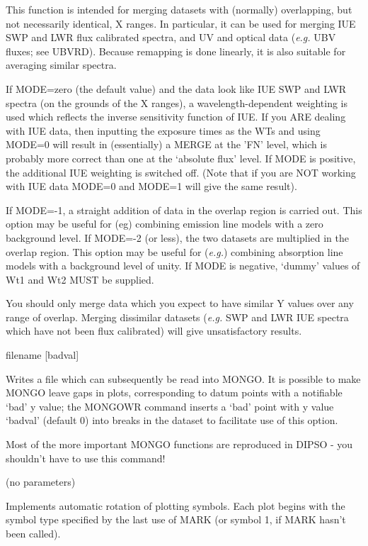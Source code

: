 \begin {description}
This function is intended for merging datasets with (normally)
overlapping, but not necessarily identical, X ranges. In particular,
it can be used for merging IUE SWP and LWR flux calibrated spectra,
and UV and optical data ({\em e.g.} UBV fluxes; see UBVRD). Because
remapping is done linearly, it is also suitable for averaging similar
spectra.

If MODE=zero (the default value) and the data look like IUE SWP and
LWR spectra (on the grounds of the X ranges), a wavelength-dependent
weighting is used which reflects the inverse sensitivity function of
IUE. If you ARE dealing with IUE data, then inputting the exposure
times as the WTs and using MODE=0 will result in (essentially) a MERGE
at the 'FN' level, which is probably more correct than one at the
`absolute flux' level. If MODE is positive, the additional IUE
weighting is switched off. (Note that if you are NOT working with IUE
data MODE=0 and MODE=1 will give the same result).

If MODE=-1, a straight addition of data in the overlap region is
carried out. This option may be useful for (eg) combining emission
line models with a zero background level. If MODE=-2 (or less), the
two datasets are multiplied in the overlap region. This option may be
useful for ({\em e.g.}) combining absorption line models with a
background level of unity. If MODE is negative, `dummy' values of Wt1
and Wt2 MUST be supplied.

You should only merge data which you expect to have similar Y values
over any range of overlap. Merging dissimilar datasets ({\em e.g.} SWP
and LWR IUE spectra which have not been flux calibrated) will give
unsatisfactory results.

\item [MONGOWR] filename [badval]

Writes a file which can subsequently be read into MONGO. It is
possible to make MONGO leave gaps in plots, corresponding to datum
points with a notifiable `bad' y value; the MONGOWR command inserts a
`bad' point with y value `badval' (default 0) into breaks in the
dataset to facilitate use of this option.

Most of the more important MONGO functions are reproduced in DIPSO -
you shouldn't have to use this command!

\item [MROT] (no parameters)

Implements automatic rotation of plotting symbols. Each plot begins
with the symbol type specified by the last use of MARK (or symbol 1,
if MARK hasn't been called).


\end{description}
